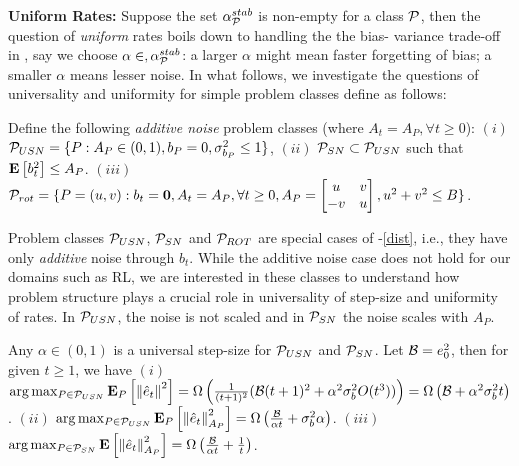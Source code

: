 \textbf{Uniform Rates:} Suppose the set $\alpha^{stab}_{\P}$ is non-empty for a class $\P$, then the question of \emph{uniform} rates boils down to handling the the bias-
variance trade-off in , say we choose $\alpha\in,\alpha^{stab}_{\P}$: a larger $\alpha$ might mean faster forgetting of bias; a smaller $\alpha$ means lesser noise. In what follows, we investigate the questions of universality and uniformity for simple problem classes define as follows:
\begin{definition}
Define the following \emph{additive noise} problem classes (where $A_t=A_P,\forall t\geq 0$): $(i)$  $\P_{USN}=\{ P: A_P\in (0,1) , b_P=0, \sigma^2_{b_P}\leq 1\}$, $(ii)$ $\P_{SN}\subset \P_{USN}$ such that $\EE{b_t^2}\leq A_P$. $(iii)$ $\P_{rot}=\{P=(u,v): b_t=\mathbf{0}, A_t=A_P, \forall t\geq 0, A_P=\left[\begin{matrix} u &v \\ -v & u\end{matrix}\right], u^2+v^2\leq B\}$.
\end{definition}
Problem classes $\P_{USN}$, $\P_{SN}$ and $\P_{ROT}$ are special cases of -\eqref{dist}, i.e., they have only \emph{additive} noise through $b_t$. While the additive noise case does not hold for our domains such as RL, we are interested in these classes to understand how problem structure plays a crucial role in universality of step-size and uniformity of rates. In $\P_{USN}$, the noise is not scaled and in $\P_{SN}$ the noise scales with $A_P$.
\begin{theorem}\label{th:pspd}
Any $\alpha\in(0,1)$ is a universal step-size for $\P_{USN}$ and $\P_{SN}$. Let $\B=e_0^2$, then for given $t\geq 1$, we have $(i)$  $\arg\max_{P\in \P_{USN}}\eep{\norm{\eh_t}^2}{P}=\Omega\left( \frac{1}{(t+1)^2}(\B (t+1)^2+ \alpha^2\sigma_b^2 O(t^3))\right)=\Omega\left(\B+\alpha^2\sigma_b^2 t \right)$. $(ii)$ $\arg\max_{P\in \P_{USN}}\eep{\norm{\eh_t}^2_{A_P}}{P} = \Omega\left(\frac{\B}{\alpha t}+\sigma^2_b\alpha\right)$. $(iii)$ $\arg\max_{P\in \P_{SN}}\EE{\norm{\eh_t}^2_{A_P}}= \Omega\left(\frac{\B}{\alpha t}+\frac{1}{t}\right)$.
\end{theorem}
